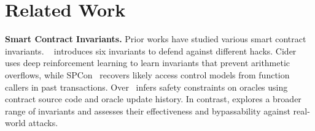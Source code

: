 \vspace{-5mm}
\section{Related Work}

\label{sec:relatedWork}





\noindent
\textbf{Smart Contract Invariants.} 
Prior works have studied various smart contract invariants. \citeauthor{zhou2020ever}~\cite{zhou2020ever} introduces six invariants to defend against different hacks. Cider~\cite{liu2022learning} uses deep reinforcement learning to learn invariants that prevent arithmetic overflows, while SPCon~\cite{liu2022finding} recovers likely access control models from function callers in past transactions. Over~\cite{deng2024safeguarding} infers safety constraints on oracles using contract source code and oracle update history. In contrast, {\name} explores a broader range of invariants and assesses their effectiveness and bypassability against real-world attacks.







